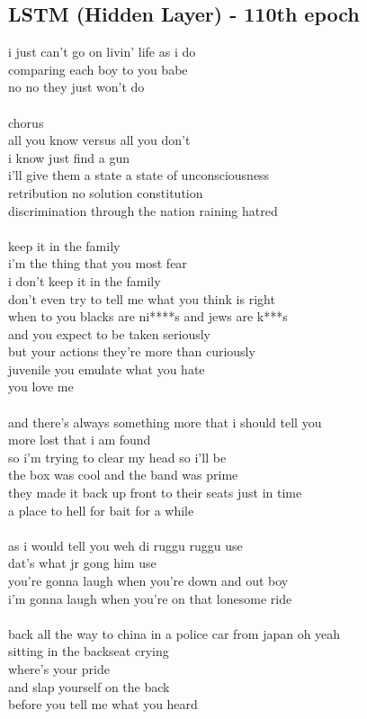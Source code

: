 \documentclass[conference]{IEEEtran}
\begin{document}
\subsection{LSTM (Hidden Layer) - 110th epoch}\label{HID110}
i just can't go on livin' life as i do \\
comparing each boy to you babe \\
no no they just won't do \\
\\
chorus \\
all you know versus all you don't \\
i know just find a gun \\
i'll give them a state a state of unconsciousness \\
retribution no solution constitution \\
discrimination through the nation raining hatred \\
\\
keep it in the family \\
i'm the thing that you most fear \\
i don't keep it in the family \\
don't even try to tell me what you think is right \\
when to you blacks are ni****s and jews are k***s \\
and you expect to be taken seriously \\
but your actions they're more than curiously \\
juvenile you emulate what you hate \\
you love me \\
\\
and there's always something more that i should tell you \\
more lost that i am found \\
so i'm trying to clear my head so i'll be \\
the box was cool and the band was prime \\
they made it back up front to their seats just in time \\
a place to hell for bait for a while \\
\\
as i would tell you weh di ruggu ruggu use \\
dat's what jr gong him use \\
you're gonna laugh when you're down and out boy \\
i'm gonna laugh when you're on that lonesome ride \\
\\
back all the way to china in a police car from japan oh yeah \\
sitting in the backseat crying \\
where's your pride \\
and slap yourself on the back \\
before you tell me what you heard \\
\end{document}
